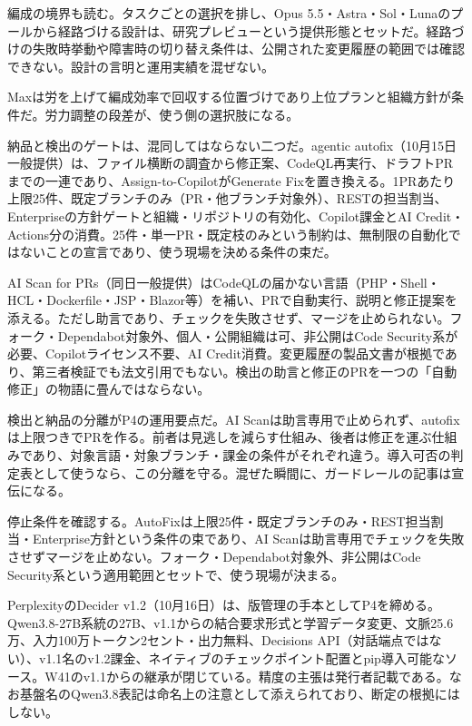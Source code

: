 \documentclass[lualatex,a4paper,10pt]{jlreq}
\begin{document}
編成の境界も読む。タスクごとの選択を排し、Opus 5.5・Astra・Sol・Lunaのプールから経路づける設計は、研究プレビューという提供形態とセットだ。経路づけの失敗時挙動や障害時の切り替え条件は、公開された変更履歴の範囲では確認できない。設計の言明と運用実績を混ぜない。
\cite{B33,B76}


Maxは労を上げて編成効率で回収する位置づけであり上位プランと組織方針が条件だ。労力調整の段差が、使う側の選択肢になる。
\cite{B33,B76}


納品と検出のゲートは、混同してはならない二つだ。agentic autofix（10月15日一般提供）は、ファイル横断の調査から修正案、CodeQL再実行、ドラフトPRまでの一連であり、Assign-to-CopilotがGenerate Fixを置き換える。1PRあたり上限25件、既定ブランチのみ（PR・他ブランチ対象外）、RESTの担当割当、Enterpriseの方針ゲートと組織・リポジトリの有効化、Copilot課金とAI Credit・Actions分の消費。25件・単一PR・既定枝のみという制約は、無制限の自動化ではないことの宣言であり、使う現場を決める条件の束だ。
\cite{B34,B77}


AI Scan for PRs（同日一般提供）はCodeQLの届かない言語（PHP・Shell・HCL・Dockerfile・JSP・Blazor等）を補い、PRで自動実行、説明と修正提案を添える。ただし助言であり、チェックを失敗させず、マージを止められない。フォーク・Dependabot対象外、個人・公開組織は可、非公開はCode Security系が必要、Copilotライセンス不要、AI Credit消費。変更履歴の製品文書が根拠であり、第三者検証でも法文引用でもない。検出の助言と修正のPRを一つの「自動修正」の物語に畳んではならない。
\cite{B35,B78}


検出と納品の分離がP4の運用要点だ。AI Scanは助言専用で止められず、autofixは上限つきでPRを作る。前者は見逃しを減らす仕組み、後者は修正を運ぶ仕組みであり、対象言語・対象ブランチ・課金の条件がそれぞれ違う。導入可否の判定表として使うなら、この分離を守る。混ぜた瞬間に、ガードレールの記事は宣伝になる。
\cite{B34,B77,B35,B78}


停止条件を確認する。AutoFixは上限25件・既定ブランチのみ・REST担当割当・Enterprise方針という条件の束であり、AI Scanは助言専用でチェックを失敗させずマージを止めない。フォーク・Dependabot対象外、非公開はCode Security系という適用範囲とセットで、使う現場が決まる。
\cite{B34,B77,B35,B78}


PerplexityのDecider v1.2（10月16日）は、版管理の手本としてP4を締める。Qwen3.8-27B系統の27B、v1.1からの結合要求形式と学習データ変更、文脈25.6万、入力100万トークン2セント・出力無料、Decisions API（対話端点ではない）、v1.1名のv1.2課金、ネイティブのチェックポイント配置とpip導入可能なソース。W41のv1.1からの継承が閉じている。精度の主張は発行者記載である。なお基盤名のQwen3.8表記は命名上の注意として添えられており、断定の根拠にはしない。
\cite{B37,B36,B38}
\end{document}
